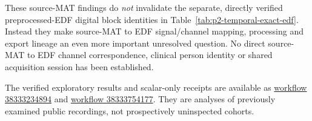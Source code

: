 These source-MAT findings do
\emph{not} invalidate the separate,
directly verified preprocessed-EDF
digital block identities in
Table~\ref{tab:p2-temporal-exact-edf}.
Instead they make source-MAT to
EDF signal/channel mapping,
processing and export lineage
an even more important unresolved
question. No direct source-MAT
to EDF channel correspondence,
clinical person identity or
shared acquisition session
has been established.

The verified exploratory results and scalar-only
receipts are available as
\href{https://github.com/lindicaphxag-tech/kaggle/actions/runs/38333234894}{workflow 38333234894}
and
\href{https://github.com/lindicaphxag-tech/kaggle/actions/runs/38333754177}{workflow 38333754177}.
They are analyses of previously
examined public recordings, not
prospectively uninspected cohorts.

